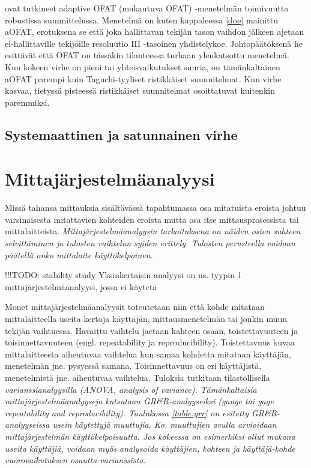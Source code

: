 \documentclass[12pt,a4paper,finnish]{tutthesis}
\newcommand\todo[1]{{\color{red}!!!TODO: #1}} %
\begin{document}
\textcite{frey2008adaptive} ovat tutkineet adaptive OFAT (mukautuva OFAT) -menetelmän
toimivuutta robustissa suunnittelussa. Menetelmä on kuten kappaleessa \ref{doe} mainittu
aOFAT, erotuksena se että joka hallittavan tekijän tason vaihdon
jälkeen ajetaan ei-hallittaville tekijöille resoluutio III -tasoinen
yhdistelykoe. Johtopäätöksenä he esittävät että OFAT on tässäkin tilanteessa
turhaan ylenkatsottu menetelmä. Kun kokeen virhe on pieni
tai yhteisvaikutukset suuria, on
tämänkaltainen aOFAT parempi kuin Taguchi-tyyliset ristikkäiset suunnitelmat.
Kun virhe kasvaa, tietyssä pisteessä ristikkäiset suunnitelmat osoittatuvat
kuitenkin paremmiksi.








\section{Systemaattinen ja satunnainen virhe}



\chapter{Mittajärjestelmäanalyysi}
\label{ch:grr}


Missä tahansa mittauksia sisältävässä tapahtumassa osa mitatuista
eroista johtuu varsinaisesta mitattavien kohteiden eroista mutta osa itse mittausprosessista
tai mittalaitteista. \em Mittajärjestelmäanalyysin \em tarkoituksena
on näiden osien suhteen selvittäminen ja tulosten vaihtelun syiden erittely.
Tulosten perusteella voidaan päätellä onko mittalaite käyttökelpoinen.

\todo{stability study}
Yksinkertaisin analyysi on ns. tyypin 1 mittajärjestelmäanalyysi, jossa ei
käytetä


Monet mittajärjestelmäanalyysit toteutetaan niin että kohde mitataan
mittalaitteella useita kertoja käyttäjän, mittausmenetelmän tai jonkin muun
tekijän vaihtuessa. Havaittu vaihtelu jaetaan kahteen osaan, toistettavuuteen
ja toisinnettavuuteen (engl. repeatability ja reproducibility). Toistettavuus
kuvaa mittalaitteesta aiheutuvaa vaihtelua kun samaa
kohdetta mitataan käyttäjän, menetelmän jne. pysyessä samana. Toisinnettavuus
on eri käyttäjistä, menetelmistä jne. aiheutuvaa vaihtelua.
Tuloksia tutkitaan tilastollisella \em varianssianalyysilla \em (ANOVA, analysis of variance).
Tämänkaltaisia mittajärjestelmäanalyyseja kutsutaan GR\&R-analyyseiksi
(gauge tai gage repeatability and reproducibility).
Taulukossa \ref{table:grr} on esitetty GR\&R-analyyseissa usein käytettyjä
muuttujia. Ko. muuttujien avulla arvioidaan mittajärjestelmän käyttökelpoisuutta.
Jos kokeessa on esimerkiksi ollut mukana useita käyttäjiä, voidaan myös
analysoida käyttäjien, kohteen ja käyttäjä-kohde vuorovaikutuksen osuutta
varianssista.
\end{document}
